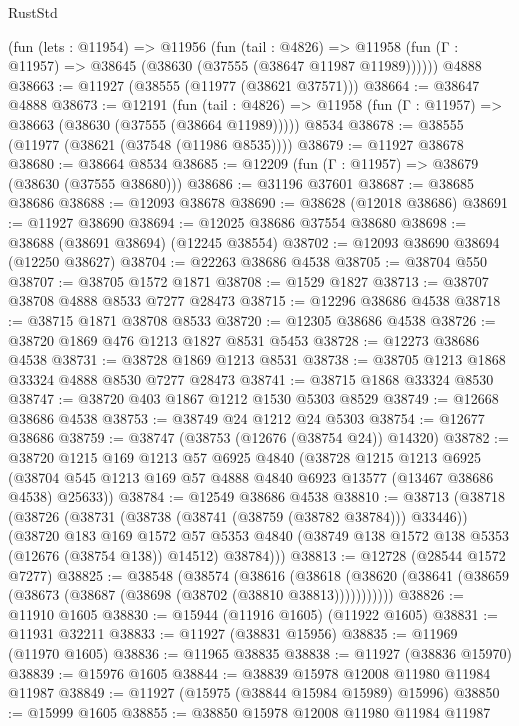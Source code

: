 \begin{lexlean}{RustStd}
\begin{coremodule}
    (fun (lets : @11954) =>
    @11956
      (fun (tail : @4826) =>
      @11958 (fun (Γ : @11957) => @38645 (@38630 (@37555 (@38647 @11987 @11989))))))
    @4888
@38663 := @11927 (@38555 (@11977 (@38621 @37571)))
@38664 := @38647 @4888
@38673 := @12191
    (fun (tail : @4826) => @11958 (fun (Γ : @11957) => @38663 (@38630 (@37555 (@38664 @11989)))))
    @8534
@38678 := @38555 (@11977 (@38621 (@37548 (@11986 @8535))))
@38679 := @11927 @38678
@38680 := @38664 @8534
@38685 := @12209 (fun (Γ : @11957) => @38679 (@38630 (@37555 @38680)))
@38686 := @31196 @37601
@38687 := @38685 @38686
@38688 := @12093 @38678
@38690 := @38628 (@12018 @38686)
@38691 := @11927 @38690
@38694 := @12025 @38686 @37554 @38680
@38698 := @38688 (@38691 @38694) (@12245 @38554)
@38702 := @12093 @38690 @38694 (@12250 @38627)
@38704 := @22263 @38686 @4538
@38705 := @38704 @550
@38707 := @38705 @1572 @1871
@38708 := @1529 @1827
@38713 := @38707 @38708 @4888 @8533 @7277 @28473
@38715 := @12296 @38686 @4538
@38718 := @38715 @1871 @38708 @8533
@38720 := @12305 @38686 @4538
@38726 := @38720 @1869 @476 @1213 @1827 @8531 @5453
@38728 := @12273 @38686 @4538
@38731 := @38728 @1869 @1213 @8531
@38738 := @38705 @1213 @1868 @33324 @4888 @8530 @7277 @28473
@38741 := @38715 @1868 @33324 @8530
@38747 := @38720 @403 @1867 @1212 @1530 @5303 @8529
@38749 := @12668 @38686 @4538
@38753 := @38749 @24 @1212 @24 @5303
@38754 := @12677 @38686
@38759 := @38747 (@38753 (@12676 (@38754 @24)) @14320)
@38782 := @38720
    @1215
    @169
    @1213
    @57
    @6925
    @4840
    (@38728
      @1215
      @1213
      @6925
      (@38704 @545 @1213 @169 @57 @4888 @4840 @6923 @13577 (@13467 @38686 @4538) @25633))
@38784 := @12549 @38686 @4538
@38810 := @38713
    (@38718
      (@38726
        (@38731 (@38738 (@38741 (@38759 (@38782 @38784))) @33446))
        (@38720
          @183
          @169
          @1572
          @57
          @5353
          @4840
          (@38749 @138 @1572 @138 @5353 (@12676 (@38754 @138)) @14512)
          @38784)))
@38813 := @12728 (@28544 @1572 @7277)
@38825 := @38548
    (@38574
      (@38616
        (@38618 (@38620 (@38641 (@38659 (@38673 (@38687 (@38698 (@38702 (@38810 @38813)))))))))))
@38826 := @11910 @1605
@38830 := @15944 (@11916 @1605) (@11922 @1605)
@38831 := @11931 @32211
@38833 := @11927 (@38831 @15956)
@38835 := @11969 (@11970 @1605)
@38836 := @11965 @38835
@38838 := @11927 (@38836 @15970)
@38839 := @15976 @1605
@38844 := @38839 @15978 @12008 @11980 @11984 @11987
@38849 := @11927 (@15975 (@38844 @15984 @15989) @15996)
@38850 := @15999 @1605
@38855 := @38850 @15978 @12008 @11980 @11984 @11987

\end{coremodule}
\end{lexlean}
